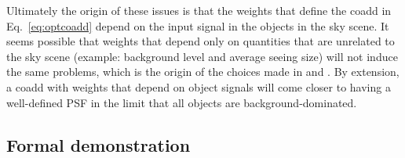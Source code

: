 \documentclass{aastex63}
\begin{document}
Ultimately the origin of these issues is that the weights that define the coadd in Eq.~\eqref{eq:optcoadd} depend on the input signal in the objects in the sky scene.  It seems possible that weights that depend only on quantities that are unrelated to the sky scene (example: background level and average seeing size) will not induce the same problems, which is the origin of the choices made in \citet{2014ApJ...794..120A} and \citet{2017ApJ...836..187Z}.  By extension, a coadd with weights that depend on object signals will come closer to having a well-defined PSF in the limit that all objects are background-dominated.

 \subsection{Formal demonstration}\label{subsec:formal}
\end{document}

